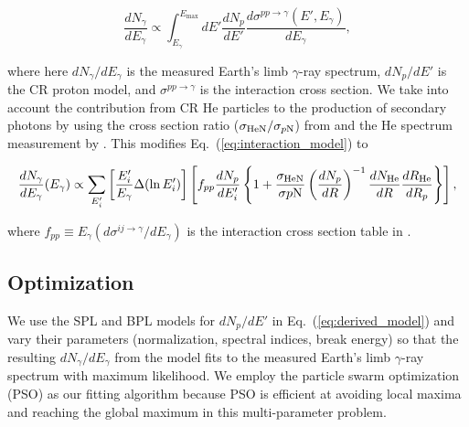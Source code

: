 \begin{equation}
    \frac{dN_\gamma}{dE_\gamma}\propto \int^{E_{\text{max}}}_{E_\gamma} dE'\frac{dN_p}{dE'} \frac{d\sigma^{pp\rightarrow\gamma}(E',E_\gamma)}{dE_\gamma}
    ,\label{eq:interaction_model}
\end{equation}

where here $dN_\gamma/dE_\gamma$ is the measured Earth's limb $\gamma$-ray spectrum,
$dN_p/dE'$ is the CR proton model, and $\sigma^{pp\rightarrow\gamma}$ is the interaction
cross section.
We take into account the contribution from CR He particles to the production of secondary
photons by using the cross section ratio ($\sigma_{\rm HeN}/\sigma_{p\rm N}$) from
\cite{WAtwater} and the He spectrum measurement by \cite{AMS-02Helium}. This modifies
Eq.~(\ref{eq:interaction_model}) to

\begin{equation}
    \frac{dN_{\gamma}}{dE_\gamma}(E_\gamma) \propto
    \sum_{E'_i}\left[\frac{E'_i}{E_{\gamma}}\Delta(\ln E'_i) \right]
    \left[ 
        f_{pp}\frac{dN_p}{dE'_i}
        \left\{
            1+\frac{\sigma_{\text{HeN}}}{\sigma{p\rm N}}\left(\frac{dN_p}{dR}\right)^{-1} \frac{dN_{\text{He}}}{dR} \frac{dR_{\text{He}}}{dR_p} 
        \right\}
    \right]
    ,\label{eq:derived_model}
\end{equation}

where $f_{pp} \equiv E_\gamma(d\sigma^{ij\rightarrow\gamma}/dE_\gamma)$
is the interaction cross section table in \cite{K&Omodel}.

\subsection{Optimization}

We use the SPL and BPL models for $dN_p/dE'$ in Eq.~(\ref{eq:derived_model}) and vary their parameters
(normalization, spectral indices, break energy) so that the resulting $dN_\gamma/dE_\gamma$
from the model fits to the measured Earth's limb $\gamma$-ray spectrum with maximum
likelihood. We employ the particle swarm optimization (PSO) \cite{pso_optimize} as our fitting algorithm
because PSO is efficient at avoiding local maxima and reaching the global maximum in
this multi-parameter problem.



